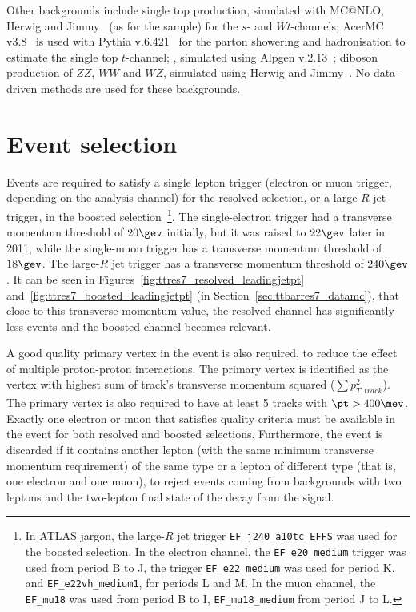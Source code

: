 Other backgrounds include single top production, simulated with MC@NLO, Herwig and Jimmy~\cite{mcatnlo4_gen,herwig1,herwig2,jimmy} (as for the \ttbar sample) for
the $s$- and $Wt$-channels; AcerMC v3.8~\cite{acermc} is used with Pythia v.6.421~\cite{pythia} for the parton showering and hadronisation to estimate the single top $t$-channel;
\zjets, simulated using Alpgen v.2.13~\cite{alpgen};
diboson production of $ZZ$, $WW$ and $WZ$, simulated using Herwig and Jimmy~\cite{herwig1,herwig2,jimmy}. No data-driven methods are used for these backgrounds.

\section{Event selection}
\label{sec:ttbarres7_sel}

Events are required to satisfy a single lepton trigger (electron or muon trigger, depending on the analysis channel) for the resolved selection,
or a large-$R$ jet trigger, in the boosted selection~\footnote{In ATLAS jargon, the large-$R$ jet trigger \texttt{EF\_j240\_a10tc\_EFFS} was used for the
boosted selection. In the electron channel, the \texttt{EF\_e20\_medium} trigger was used from period B to J, the trigger \texttt{EF\_e22\_medium} was used for period K, and
\texttt{EF\_e22vh\_medium1}, for periods L and M. In the muon channel, the \texttt{EF\_mu18} was used from period B to I, \texttt{EF\_mu18\_medium} from period J to L.}.
The single-electron trigger had a transverse momentum threshold of $20\gev$ initially, but it was
raised to $22\gev$ later in 2011, while the
single-muon trigger has a transverse momentum threshold of $18\gev$. The large-$R$ jet trigger has a transverse momentum threshold of $240\gev$.
It can be seen in Figures~\ref{fig:ttres7_resolved_leadingjetpt}
and~\ref{fig:ttres7_boosted_leadingjetpt} (in Section~\ref{sec:ttbarres7_datamc}), that close to this
transverse momentum value, the resolved channel has significantly
less events and the boosted channel becomes relevant.

A good quality primary vertex in the event is also required, to reduce the effect of multiple proton-proton interactions. The primary vertex is identified 
as the vertex with highest sum of track's transverse momentum squared ($\sum p_{T, track}^2$). The primary vertex is
also required to have at least 5 tracks with $\pt > 400\mev$.
Exactly one electron or muon that satisfies quality criteria must be available in the event for both resolved and boosted selections. Furthermore, the event is discarded if it contains another lepton (with the same minimum transverse momentum requirement) of
the same type or a lepton of different type (that is, one electron and one muon), to reject events coming from backgrounds with two leptons and the two-lepton final
state of the \ttbar decay from the signal.

